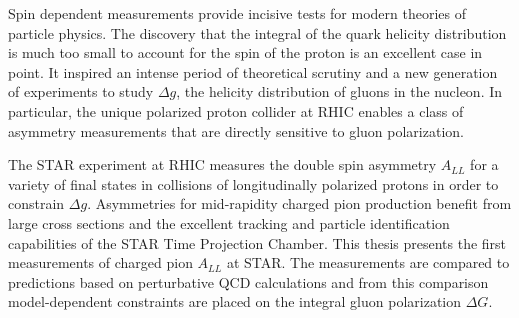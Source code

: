 Spin dependent measurements provide incisive tests for modern theories of particle physics.  The discovery that the integral of the quark helicity distribution is much too small to account for the spin of the proton is an excellent case in point.  It inspired an intense period of theoretical scrutiny and a new generation of experiments to study \(\Delta g\), the helicity distribution of gluons in the nucleon.  In particular, the unique polarized proton collider at RHIC enables a class of asymmetry measurements that are directly sensitive to gluon polarization.

The STAR experiment at RHIC measures the double spin asymmetry \(A_{LL}\) for a variety of final states in collisions of longitudinally polarized protons in order to constrain \(\Delta g\). Asymmetries for mid-rapidity charged pion production benefit from large cross sections and the excellent tracking and particle identification capabilities of the STAR Time Projection Chamber. This thesis presents the first measurements of charged pion \(A_{LL}\) at STAR. The measurements are compared to predictions based on perturbative QCD calculations and from this comparison model-dependent constraints are placed on the integral gluon polarization \(\Delta G\).
